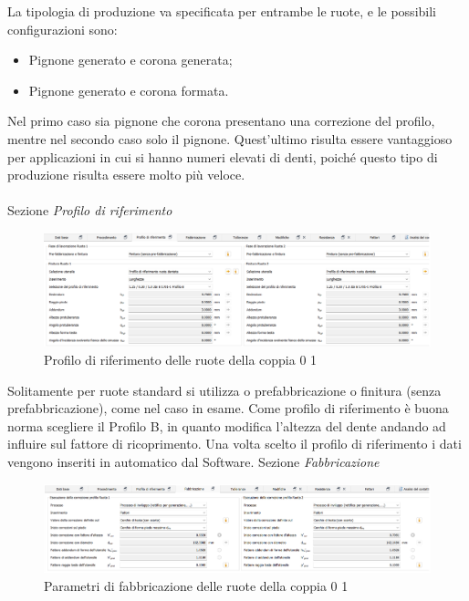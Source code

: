 La tipologia di produzione va specificata per entrambe le ruote, e le possibili configurazioni sono:
\begin{itemize}
    \item Pignone generato e corona generata;
    \item Pignone generato e corona formata.
\end{itemize}
Nel primo caso sia pignone che corona presentano una correzione del profilo, mentre nel secondo caso solo il pignone. Quest'ultimo risulta essere vantaggioso per applicazioni in cui si hanno numeri elevati di denti, poiché questo tipo di produzione risulta essere molto più veloce. \\
\\
Sezione \emph{Profilo di riferimento}
\begin{figure}[h]
    \centering
    \includegraphics[scale=0.5]{Immagini/ProfiloRiferimentoCoppia01.png}
    \caption{Profilo di riferimento delle ruote della coppia 0 1}
    \label{fig:ProfiloRiferimentoCoppia01}
\end{figure}

Solitamente per ruote standard si utilizza o prefabbricazione o finitura (senza prefabbricazione), come nel caso in esame. Come profilo di riferimento è buona norma scegliere il Profilo B, in quanto modifica l’altezza del dente andando ad influire sul fattore di ricoprimento. Una volta scelto il profilo di riferimento i dati vengono inseriti in automatico dal Software.
\newpage
Sezione \emph{Fabbricazione}
\begin{figure}[h]
    \centering
    \includegraphics[scale=0.47]{Immagini/FabbricazioneCoppia01.png}
    \caption{Parametri di fabbricazione delle ruote della coppia 0 1}
    \label{fig:FabbricazioneCoppia01}
\end{figure}

